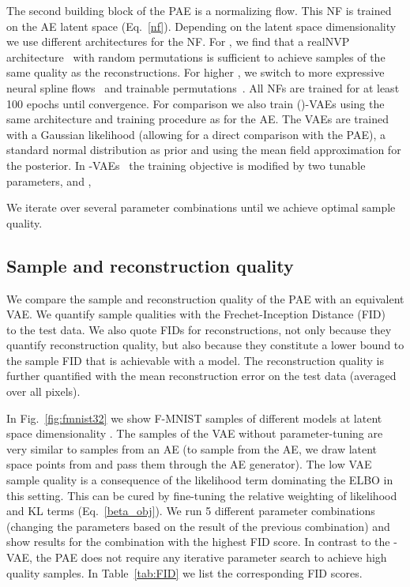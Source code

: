 \documentclass{article}
\begin{document}
The second building block of the PAE is a normalizing flow. This NF is trained on the AE latent space (Eq.~\ref{nf}). Depending on the latent space dimensionality we use different architectures for the NF. For , we find that a realNVP architecture~\citep{DinhSB16} with random permutations is sufficient to achieve samples of the same quality as the reconstructions. For higher , we switch to more expressive neural spline flows~\citep{nsf} and trainable permutations~\citep{KingmaD18}. All NFs are trained for at least 100 epochs until convergence. 
For comparison we also train ()-VAEs using the same architecture and training procedure as for the AE. The VAEs are trained with a Gaussian likelihood (allowing for a direct comparison with the PAE), a standard normal distribution as prior and using the mean field approximation for the posterior. 
In -VAEs~\citep{beta-VAE} the training objective is modified by two tunable parameters,  and ,

We iterate over several parameter combinations until we achieve optimal sample quality.
\subsection{Sample and reconstruction quality}
We compare the sample and reconstruction quality of the PAE with an equivalent VAE. We quantify sample qualities with the Frechet-Inception Distance (FID)~\citep{FID_Heusel} to the test data. We also quote FIDs for reconstructions, not only because they quantify reconstruction quality, but also because they constitute a lower bound to the sample FID that is achievable with a model. The reconstruction quality is further quantified with the mean reconstruction error on the test data (averaged over all pixels).

In Fig.~\ref{fig:fmnist32} we show F-MNIST samples of different models at latent space dimensionality . The samples of the VAE without parameter-tuning are very similar to samples from an AE (to sample from the AE, we draw latent space points from  and pass them through the AE generator). The low VAE sample quality is a consequence of the likelihood term dominating the ELBO in this setting. This can be cured by fine-tuning the relative weighting of likelihood and KL terms (Eq.~\ref{beta_obj}). We run 5 different parameter combinations (changing the parameters based on the result of the previous combination) and show results for the combination with the highest FID score. In contrast to the -VAE, the PAE does not require any iterative parameter search to achieve high quality samples. In Table~\ref{tab:FID} we list the corresponding FID scores.
\end{document}
